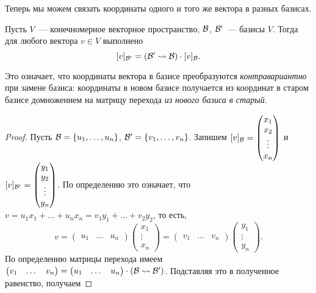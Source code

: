 Теперь мы можем связать координаты одного и того же вектора в разных
базисах.

\begin{theorem}\label{thm:change_of_coordinates}
Пусть $V$~--- конечномерное векторное пространство, $\mathcal B$, $\mathcal
B'$~--- базисы $V$. Тогда для любого вектора $v\in V$ выполнено
$$
[v]_{\mathcal B'} = (\mathcal B'\rightsquigarrow\mathcal B)\cdot [v]_{\mathcal B}.
$$
\end{theorem}
\begin{remark}\label{rem:contravariant_change}
Это означает, что координаты вектора в базисе преобразуются
{\em контравариантно} при замене базиса: координаты в новом базисе
получается из координат в старом базисе домножением на матрицу
перехода {\em из нового базиса в старый}.
\end{remark}
\begin{proof}
Пусть $\mathcal B=\{u_1,\dots,u_n\}$, $\mathcal B'=\{v_1,\dots,v_n\}$.
Запишем $[v]_{\mathcal B} =
\begin{pmatrix} x_1 \\ x_2 \\ \vdots \\ x_n\end{pmatrix}$ и
$[v]_{\mathcal B'} = 
\begin{pmatrix} y_1 \\ y_2 \\ \vdots \\ y_n\end{pmatrix}$.
По определению это означает,
что $v = u_1x_1+\dots+u_nx_n = v_1y_1+\dots+v_2y_2$,
то есть,
$$v=\begin{pmatrix}u_1 & \dots & u_n\end{pmatrix}
\begin{pmatrix}x_1 \\ \vdots \\ x_n\end{pmatrix} = 
\begin{pmatrix}v_1 & \dots & v_n\end{pmatrix}
\begin{pmatrix}y_1 \\ \vdots \\ y_n\end{pmatrix}.$$
По определению матрицы перехода имеем
$\begin{pmatrix}v_1 & \dots & v_n\end{pmatrix}
=\begin{pmatrix}u_1 & \dots & u_n\end{pmatrix}
\cdot (\mathcal B\rightsquigarrow\mathcal B')$.
Подставляя это в полученное равенство, получаем

\end{proof}
